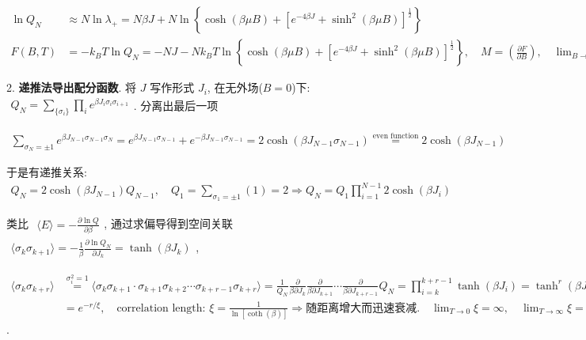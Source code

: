 \documentclass[../../main.tex]{subfiles}
\begin{document}
$\begin{aligned}
    \ln{Q_{N}} &\approx N\ln{\lambda_{+}} = N\beta J + N\ln{\left\{
        \cosh{(\beta\mu B)} + \left[
            e^{-4\beta J} + \sinh^{2}{(\beta\mu B)}
        \right]^{\frac{1}{2}}
    \right\}}\\
    F(B,T) &= -k_{B}T\ln{Q_{N}} = -NJ - Nk_{B}T\ln{\left\{
        \cosh{(\beta\mu B)} + \left[
            e^{-4\beta J} + \sinh^{2}{(\beta\mu B)}
        \right]^{\frac{1}{2}}
    \right\}},\quad M = \left(\frac{\partial F}{\partial B}\right),\quad \lim_{B\rightarrow 0}M = 0
\end{aligned}$

2. \textbf{递推法导出配分函数}. 将 $J$ 写作形式 $J_{i}$, 在无外场($B=0$)下: $\begin{aligned}
    Q_{N} = \sum_{\{\sigma_{i}\}}\prod_{i}e^{\beta J_{i}\sigma_{i}\sigma_{i+1}}
\end{aligned}$. 分离出最后一项 

$\begin{aligned}
    \sum_{\sigma_{N}=\pm 1}e^{\beta J_{N-1}\sigma_{N-1}\sigma_{N}} = e^{\beta J_{N-1}\sigma_{N-1}} + e^{-\beta J_{N-1}\sigma_{N-1}} = 2\cosh{(\beta J_{N-1}\sigma_{N-1})} \stackrel{\text{even function}}{=} 2\cosh{(\beta J_{N-1})}
\end{aligned}$

于是有递推关系: $\begin{aligned}
    Q_{N} = 2\cosh{(\beta J_{N-1})}Q_{N-1},\quad Q_{1} = \sum_{\sigma_{1}=\pm 1}(1) = 2\Rightarrow Q_{N} = Q_{1}\prod_{i=1}^{N-1}2\cosh{(\beta J_{i})}
\end{aligned}$

类比 $\begin{aligned}
    \langle E\rangle = -\frac{\partial\ln{Q}}{\partial\beta}
\end{aligned}$, 通过求偏导得到空间关联 $\begin{aligned}
    \langle\sigma_{k}\sigma_{k+1}\rangle = -\frac{1}{\beta}\frac{\partial\ln{Q_{N}}}{\partial J_{k}} = \tanh{(\beta J_{k})}\end{aligned}$, 
    
    $\begin{aligned}
        \langle\sigma_{k}\sigma_{k+r}\rangle &\stackrel{\sigma_{i}^{2}=1}{=} \langle \sigma_{k}\sigma_{k+1}\cdot \sigma_{k+1}\sigma_{k+2}\cdots \sigma_{k+r-1}\sigma_{k+r}\rangle
    = \frac{1}{Q_{N}}\frac{\partial}{\beta\partial J_{k}}\frac{\partial}{\beta\partial J_{k+1}} \cdots \frac{\partial}{\beta\partial J_{k+r-1}}Q_{N}
    = \prod _{i=k}^{k+r-1}\tanh{(\beta J_{i})} = \tanh^{r}{(\beta J)}\\
    &= e^{-r/\xi},\quad \text{correlation length: }\xi = \frac{1}{\ln{[\coth{(\beta)}]}}\Rightarrow\text{随距离增大而迅速衰减}.\quad \lim_{T\rightarrow 0}\xi = \infty,\quad \lim_{T\rightarrow\infty}\xi = 0
\end{aligned}$. 
\end{document}
